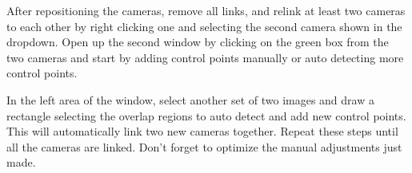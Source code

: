 \begin{fullwidth}

After repositioning the cameras, remove all links, and relink at least two cameras to each other by right clicking one and selecting the second camera shown in the dropdown. Open up the second window by clicking on the green box from the two cameras and start by adding control points manually or auto detecting more control points. 


\clearpage
In the left area of the window, select another set of two images and draw a rectangle selecting the overlap regions to auto detect and add new control points. This will automatically link two new cameras together. Repeat these steps until all the cameras are linked. Don’t forget to optimize the manual adjustments just made.



\clearpage
\end{fullwidth}